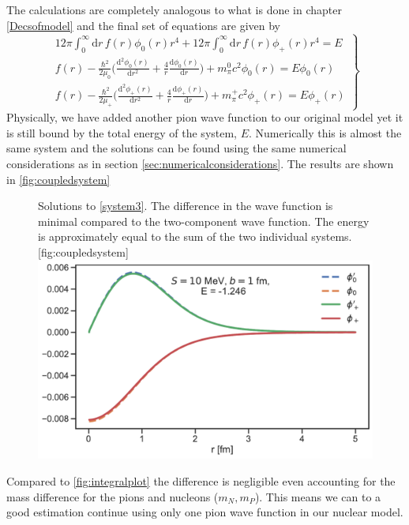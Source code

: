 The calculations are completely analogous to what is done in chapter \ref{Decsofmodel} and the final set of equations are given by
\begin{equation} \label{system3}
	\left.
	\begin{array}{ll}
		12\pi \int_0^\infty  \text{d}r \, f(r) \phi_0(r) r^4 + 12\pi \int_0^\infty  \text{d}r \, f(r) \phi_+(r) r^4 = E \\
		f(r) -\frac{\hbar^2}{2\mu_0}\Big(\frac{\text{d}^2 \phi_0(r)}{\text{d}r^2}+\frac{4}{r}\frac{\text{d}\phi_0(r)}{\text{d}r}\Big)+m_\pi^0 c^2 \phi_0(r) = E\phi_0(r) \\
		f(r) -\frac{\hbar^2}{2\mu_{+}}\Big(\frac{\text{d}^2 \phi_{+}(r)}{\text{d}r^2}+\frac{4}{r}\frac{\text{d}\phi_{+}(r)}{\text{d}r}\Big)+m_\pi^+ c^2 \phi_{+}(r) = E\phi_+(r)
	\end{array}
	\right \} 
\end{equation}
Physically, we have added another pion wave function to our original model yet it is still bound by the total energy of the system, $E$. Numerically this is almost the same system and the solutions can be found using the same numerical considerations as in section \ref{sec:numericalconsiderations}. The results are shown in \ref{fig:coupledsystem}
\begin{figure}[H]
	\begin{sidecaption}{Solutions to \eqref{system3}. The difference in the wave function is minimal compared to the two-component wave function. The energy is approximately equal to the sum of the two individual systems.}[fig:coupledsystem]
		\includegraphics[width=\linewidth]{Figures/Integralplot_CoupledSystem.pdf}
	\end{sidecaption}
\end{figure}
Compared to \ref{fig:integralplot} the difference is negligible even accounting for the mass difference for the pions and nucleons ($m_N, m_P$). This means we can to a good estimation continue using only one pion wave function in our nuclear model. 